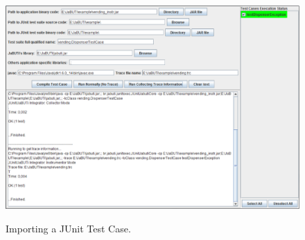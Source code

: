 
\begin{figure}[!ht]
\begin{center}
\label{fig:junit1}\includegraphics[width=\textwidth]{fig/importing-junit-1.eps}
%
\caption{Importing a JUnit Test Case.}\label{fig:importing-junit}
\end{center}
\end{figure}
